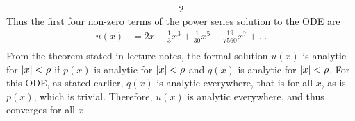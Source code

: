 \documentclass[a4paper]{article}
\newcommand{\ds}{\displaystyle}
\begin{document}
\begin{enumerate}
\begin{alignat*}{2}
	\end{alignat*}
	Thus the first four non-zero terms of the power series solution to the ODE are
	\begin{align*}
		u(x) & = 2x - \frac{1}{3}x^3 + \frac{1}{30}x^5 - \frac{19}{7560}x^7 + \dots\\
	\end{align*}
	From the theorem stated in lecture notes, the formal solution $\ds{u(x)}$ is analytic for $\ds{\abs{x} < \rho}$ if
	$\ds{p(x)}$ is analytic for $\ds{\abs{x} < \rho}$ and $\ds{q(x)}$ is analytic for $\ds{\abs{x} < \rho}$. For this ODE, as stated earlier, $\ds{q(x)}$ is analytic everywhere, that is for all $\ds{x}$, as is $\ds{p(x)}$, which is trivial. Therefore, $\ds{u(x)}$ is analytic everywhere, and thus converges for all $\ds{x}$.

	\bigbreak 


\end{enumerate}
\end{document}
